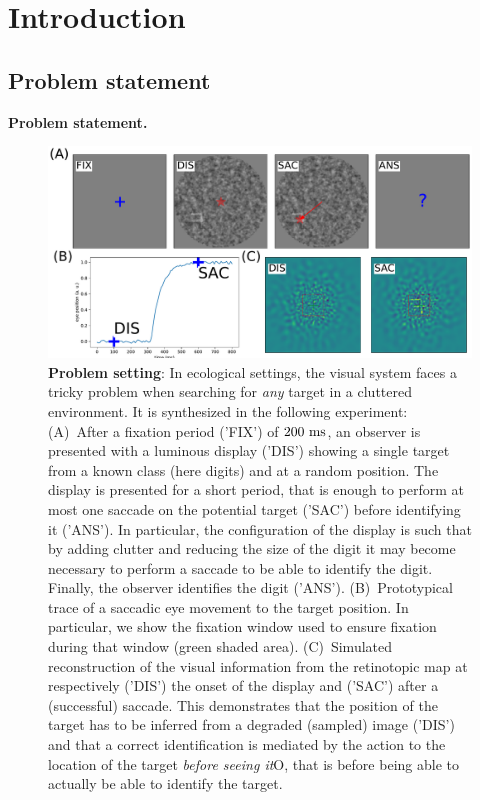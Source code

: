 \CNS
\section{Introduction}
\label{sec:intro}
\subsection{Problem statement}
\else
\textbf{Problem statement. }
\fi
\begin{figure}[b!]%
	\includegraphics[width=\linewidth]{fig_intro}
	\caption{\CNS
		{\bf Problem setting}: \fi In ecological settings, the visual system faces a tricky problem when searching for \emph{any} target in a cluttered environment. It is synthesized in the following experiment:
		(A)~After a fixation period ('FIX') of $200~\si{\milli\second}$, an observer is presented with a luminous display ('DIS') showing a single target from a known class (here digits) and at a random position. The display is presented for a short period, that is enough to perform at most one saccade on the potential target ('SAC') before identifying it ('ANS'). \CNS In particular, the configuration of the display is such that by adding clutter and reducing the size of the digit it may become necessary to perform a saccade to be able to identify the digit. Finally, the observer identifies the digit ('ANS'). \fi %
		(B)~Prototypical trace of a saccadic eye movement to the target position. \CNS In particular, we show the fixation window used to ensure fixation during that window (green shaded area). \fi (C)~Simulated reconstruction of the visual information from the retinotopic map at respectively ('DIS') the onset of the display and ('SAC') after a (successful) saccade. This demonstrates that the position of the target has to be inferred from a degraded (sampled) image ('DIS') and that a correct identification is mediated by the action to the location of the target \emph{before seeing it}\if O\CNS , that is before being able to actually be able to identify the target\fi.
		\label{fig:intro}}%
\end{figure}%
